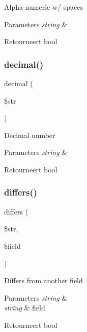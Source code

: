 Alpha-\/numeric w/ spaces


\begin{DoxyParams}{Parameters}
{\em string} & \\
\hline
\end{DoxyParams}
\begin{DoxyReturn}{Retourneert}
bool 
\end{DoxyReturn}
\mbox{\label{class_c_i___form__validation_af460b7c2f8d785b7472329446c600f31}} 
\subsubsection{\texorpdfstring{decimal()}{decimal()}}
{\footnotesize\ttfamily decimal (\begin{DoxyParamCaption}\item[{}]{\$str }\end{DoxyParamCaption})}

Decimal number


\begin{DoxyParams}{Parameters}
{\em string} & \\
\hline
\end{DoxyParams}
\begin{DoxyReturn}{Retourneert}
bool 
\end{DoxyReturn}
\mbox{\label{class_c_i___form__validation_aff14b601a3e51ef2323a4c241d81267e}} 
\subsubsection{\texorpdfstring{differs()}{differs()}}
{\footnotesize\ttfamily differs (\begin{DoxyParamCaption}\item[{}]{\$str,  }\item[{}]{\$field }\end{DoxyParamCaption})}

Differs from another field


\begin{DoxyParams}{Parameters}
{\em string} & \\
\hline
{\em string} & field \\
\hline
\end{DoxyParams}
\begin{DoxyReturn}{Retourneert}
bool 
\end{DoxyReturn}
\mbox{\label{class_c_i___form__validation_ae8fff4cb083a2a66c900f8bd61216bdd}} 
